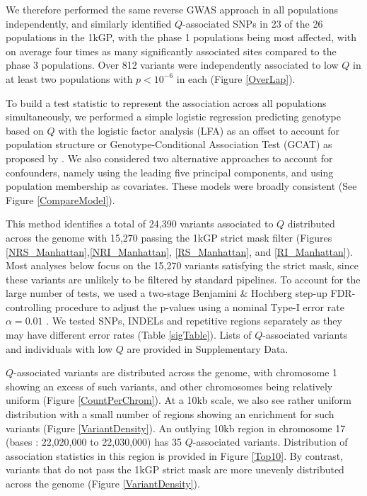 \documentclass[9pt,lineno]{template}
\begin{document}
We therefore performed the same reverse GWAS approach in all populations independently, and similarly identified $Q$-associated SNPs in 23 of the 26 populations in the 1kGP, with the phase 1 populations being most affected, with on average four times as many significantly associated sites compared to the phase 3 populations.
Over 812 variants were independently associated to low $Q$ in at least two populations with $ p < 10^{-6}$ in each (Figure \ref{OverLap}).

To build a test statistic to represent the association across all populations simultaneously, we performed a simple logistic regression predicting genotype based on $Q$ with the logistic factor analysis (LFA) as an offset to account for population structure or Genotype-Conditional Association Test  (GCAT) as proposed by \citep{song2015testing}. 
We also considered two alternative approaches to account for confounders, namely using the leading five  principal components, and using population membership as covariates. 
These models were broadly consistent (See Figure \ref{CompareModel}).

This method identifies a total of 24,390 variants associated to $Q$ distributed across the genome with 15,270 passing the 1kGP strict mask filter (Figures \ref{NRS_Manhattan},\ref{NRI_Manhattan}, \ref{RS_Manhattan}, and \ref{RI_Manhattan}). Most analyses below focus on the 15,270 variants satisfying the strict mask, since these variants are unlikely to be filtered by standard pipelines.
To account for the large number of tests, we used a two-stage Benjamini \& Hochberg step-up FDR-controlling procedure to adjust the p-values using a nominal Type-I error rate $\alpha = 0.01$ \citep{Benjamini2006}. 
We tested SNPs, INDELs and repetitive regions separately as they may have different error rates (Table \ref{sigTable}).
Lists of $Q$-associated variants and individuals with low $Q$ are provided in Supplementary Data.

$Q$-associated variants are distributed across the genome, with chromosome 1 showing an excess of such variants, and other chromosomes being relatively uniform (Figure \ref{CountPerChrom}).
At a 10kb scale, we also see rather uniform distribution with a small number of regions showing an enrichment for such variants (Figure \ref{VariantDensity}).
An outlying 10kb region in chromosome 17 (bases : 22,020,000 to  22,030,000) has 35 $Q$-associated variants.
Distribution of association statistics in this region is provided in Figure \ref{Top10}.
By contrast, variants that do not pass the 1kGP strict mask are more unevenly distributed across the genome (Figure \ref{VariantDensity}).
\end{document}
